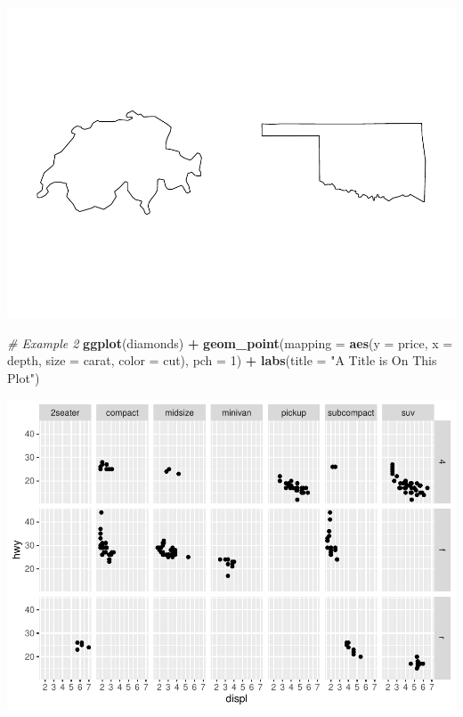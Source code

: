 \documentclass[
]{book}
\newenvironment{Shaded}{\begin{snugshade}}{\end{snugshade}}
\newcommand{\CommentTok}[1]{\textcolor[rgb]{0.56,0.35,0.01}{\textit{#1}}}
\newcommand{\DataTypeTok}[1]{\textcolor[rgb]{0.13,0.29,0.53}{#1}}
\newcommand{\DecValTok}[1]{\textcolor[rgb]{0.00,0.00,0.81}{#1}}
\newcommand{\KeywordTok}[1]{\textcolor[rgb]{0.13,0.29,0.53}{\textbf{#1}}}
\newcommand{\NormalTok}[1]{#1}
\newcommand{\OperatorTok}[1]{\textcolor[rgb]{0.81,0.36,0.00}{\textbf{#1}}}
\newcommand{\StringTok}[1]{\textcolor[rgb]{0.31,0.60,0.02}{#1}}
\begin{document}
\includegraphics{_main_files/figure-latex/unnamed-chunk-257-1.pdf}

\begin{Shaded}
\begin{Highlighting}[]
\CommentTok{# Example 2}
\KeywordTok{ggplot}\NormalTok{(diamonds) }\OperatorTok{+}\StringTok{ }\KeywordTok{geom_point}\NormalTok{(}\DataTypeTok{mapping =} \KeywordTok{aes}\NormalTok{(}\DataTypeTok{y =}\NormalTok{ price, }\DataTypeTok{x =}\NormalTok{ depth,}
    \DataTypeTok{size =}\NormalTok{ carat, }\DataTypeTok{color =}\NormalTok{ cut), }\DataTypeTok{pch =} \DecValTok{1}\NormalTok{) }\OperatorTok{+}\StringTok{ }\KeywordTok{labs}\NormalTok{(}\DataTypeTok{title =} \StringTok{"A Title is On This Plot"}\NormalTok{)}
\end{Highlighting}
\end{Shaded}

\includegraphics{_main_files/figure-latex/unnamed-chunk-257-2.pdf}
\end{document}
